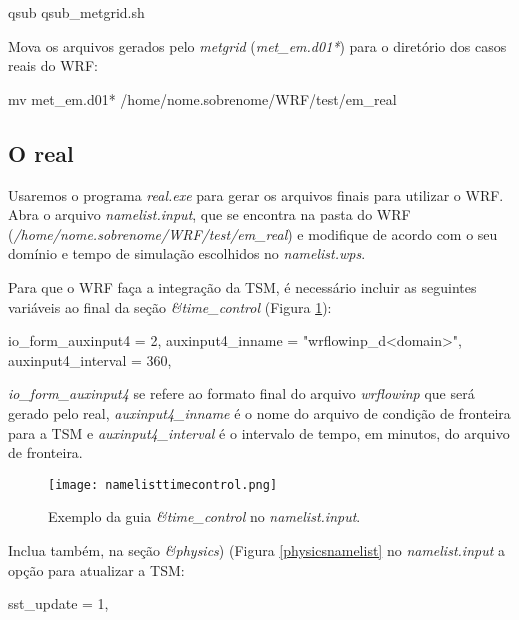 \begin{bashcode}
qsub qsub_metgrid.sh
\end{bashcode}
\bigskip

\noindent Mova os arquivos gerados pelo \textit{metgrid} (\textit{met\_em.d01*}) para o diretório dos casos reais do WRF:
\bigskip

\begin{bashcode}
 mv met_em.d01* /home/nome.sobrenome/WRF/test/em_real
\end{bashcode}
\bigskip

\subsection{O real}
\bigskip

\noindent Usaremos o programa \textit{real.exe} para gerar os arquivos finais para utilizar o WRF. Abra o arquivo \textit{namelist.input}, que se encontra na pasta do WRF (\textit{/home/nome.sobrenome/WRF/test/em\_real}) e modifique de acordo com o seu domínio e tempo de simulação escolhidos no \textit{namelist.wps}.
\bigskip

\noindent Para que o WRF faça a integração da TSM, é necessário incluir as seguintes variáveis ao final da seção \textit{\&time\_control} (Figura \textcolor{bleu_cite}{\ref{timecontrolnamelist}}):
\bigskip

\begin{bashcode}
io_form_auxinput4  = 2,
auxinput4_inname   = "wrflowinp_d<domain>",
auxinput4_interval = 360,
\end{bashcode}
\bigskip

\noindent \textit{io\_form\_auxinput4} se refere ao formato final do arquivo \textit{wrflowinp} que será gerado pelo real, \textit{auxinput4\_inname} é o nome do arquivo de condição de fronteira para a TSM e \textit{auxinput4\_interval} é o intervalo de tempo, em minutos, do arquivo de fronteira.
\bigskip

\begin{figure}[H]
    \centering
    \texttt{[image: namelisttimecontrol.png]}
    \caption{Exemplo da guia \textit{\&time\_control} no \textit{namelist.input}.}
    \label{timecontrolnamelist}
\end{figure}
\bigskip

\noindent Inclua também, na seção \textit{\&physics}) (Figura \textcolor{bleu_cite}{\ref{physicsnamelist}} no \textit{namelist.input} a opção para atualizar a TSM:
\bigskip

\begin{bashcode}
sst_update = 1,
\end{bashcode}
\bigskip


